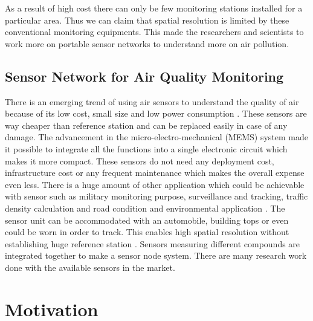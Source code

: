 As a result of high cost there can only be few monitoring stations installed for a particular area. Thus we can claim that spatial resolution is limited by these conventional monitoring equipments. This made the researchers and scientists to work more on portable sensor networks to understand more on air pollution.



\subsection{Sensor Network for Air Quality Monitoring}

There is an emerging trend of using air sensors to understand the quality of air because of its low cost, small size and low power consumption \cite{Sun2016}. These sensors are way cheaper than reference station and can be replaced easily in case of any damage. The advancement in the micro-electro-mechanical (MEMS) system made it possible to integrate all the functions into a single electronic circuit which makes it more compact. These sensors do not need any deployment cost, infrastructure cost or any frequent maintenance which makes the overall expense even less. There is a huge amount of other application which could be achievable with sensor such as military monitoring purpose, surveillance and tracking, traffic density calculation and road condition and environmental application \cite{Kadri2013}. The sensor unit can be accommodated with an automobile, building tops or even could be worn in order to track. This enables high spatial resolution without establishing huge reference station \cite{Nodes2015}. Sensors measuring different compounds are integrated together to make a sensor node system. There are many research work done with the available sensors in the market. 





\section{Motivation}

